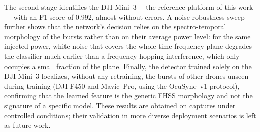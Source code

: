 The second stage identifies the DJI Mini~3 ---the reference platform of this work--- with an F1 score of 0.992, almost without errors. A noise-robustness sweep further shows that the network's decision relies on the spectro-temporal morphology of the bursts rather than on their average power level: for the same injected power, white noise that covers the whole time-frequency plane degrades the classifier much earlier than a frequency-hopping interference, which only occupies a small fraction of the plane. Finally, the detector trained solely on the DJI Mini~3 localizes, without any retraining, the bursts of other drones unseen during training (DJI F450 and Mavic~Pro, using the OcuSync~v1 protocol), confirming that the learned feature is the generic FHSS morphology and not the signature of a specific model. These results are obtained on captures under controlled conditions; their validation in more diverse deployment scenarios is left as future work.


\cleardoublepage
